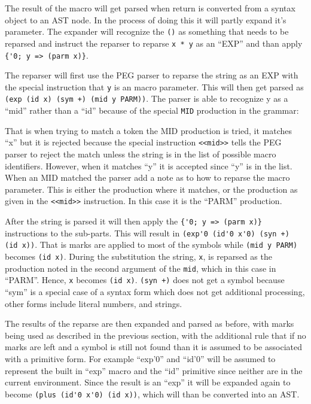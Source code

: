 \documentclass[12pt,english,letterpaper]{article}
\begin{document}
The result of the macro will get parsed when return is converted from a
syntax object to an AST node.  In the process of doing this it will
partly expand it's parameter.  The expander will recognize the \verb/()/
as something that needs to be reparsed and instruct the reparser to reparse
\verb/x * y/ as an ``EXP'' and than apply \verb/{'0; y => (parm x)}/.

The reparser will first use the PEG parser to reparse the string 
as an EXP with the special instruction that \verb/y/ is
an macro parameter.  This will then get parsed as
\verb/(exp (id x) (sym +) (mid y PARM))/.  The parser is able to recognize y
as a ``mid'' rather than a ``id'' because of the special \verb/MID/
production in the grammar:


That is when trying to match a token the MID production is tried, it
matches ``x'' but it is rejected because the special instruction
\verb/<<mid>>/ tells the PEG parser to reject the match unless the
string is in the list of possible macro identifiers.  However, when it
matches ``y'' it is accepted since ``y'' is in the list.  When an MID
matched the parser add a note as to how to reparse the macro
parameter.  This is either the production where it matches, or the
production as given in the \verb/<<mid>>/ instruction.  In this case
it is the ``PARM'' production.

After the string is parsed it will then apply the
\verb/{'0; y => (parm x)}/ instructions to the sub-parts.  This will
result in \verb/(exp'0 (id'0 x'0) (syn +) (id x))/.  That is marks are
applied to most of the symbols while \verb/(mid y PARM)/ becomes
\verb/(id x)/.  During the substitution the string, \verb/x/, is
reparsed as the production noted in the second argument of the
\verb/mid/, which in this case in ``PARM''.  Hence, \verb/x/ becomes
\verb/(id x)/.  \verb/(syn +)/ does not get a symbol because ``sym''
is a special case of a syntax form which does not get additional
processing, other forms include literal numbers, and strings.

The results of the reparse are then expanded and parsed as before,
with marks being used as described in the previous section, with the
additional rule that if no marks are left and a symbol is still not
found than it is assumed to be associated with a primitive form.  For
example ``exp'0'' and ``id'0'' will be assumed to represent the built
in ``exp'' macro and the ``id'' primitive since neither are in the
current environment.  Since the result is an ``exp'' it will be
expanded again to become \verb/(plus (id'0 x'0) (id x))/, 
which will than be converted into an AST.
\end{document}
